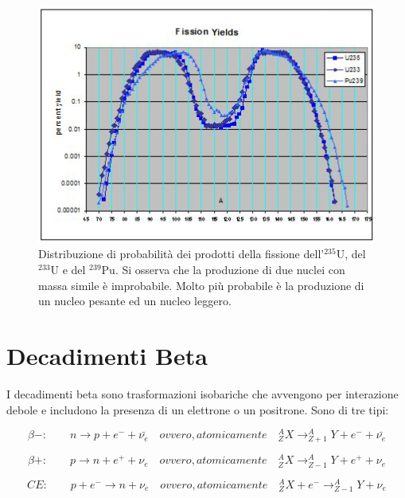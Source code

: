 \begin{figure}
\centering
		\includegraphics[width=12cm, keepaspectratio]{figs/fissionyealds.png}
		\caption{Distribuzione di probabilità dei prodotti della fissione dell'$^{235}\text{U}$, del $^{233}\text{U}$ e del $^{239}\text{Pu}$. Si osserva che la produzione di due nuclei con massa simile è improbabile. Molto più probabile è la produzione di un nucleo pesante ed un nucleo leggero.}
         \label{fissionyealds}
\end{figure}

\section{Decadimenti Beta}

I decadimenti beta sono trasformazioni isobariche che avvengono per interazione debole e includono la presenza di un elettrone o un positrone. Sono di tre tipi:

\begin{equation}
\beta-: \qquad n \longrightarrow p + e^-+\bar{\nu_e}  \quad ovvero, atomicamente \quad  ^A_ZX \longrightarrow _{Z+1}^AY+e^-+\bar{\nu_e}
\end{equation}


\begin{equation}
\beta+: \qquad p \longrightarrow n + e^++\nu_e \quad ovvero, atomicamente \quad  ^A_ZX \longrightarrow _{Z-1}^AY+e^++\nu_e
\end{equation}


\begin{equation}
CE: \qquad p + e^- \longrightarrow n + \nu_e \quad ovvero, atomicamente \quad  ^A_ZX+e^- \longrightarrow _{Z-1}^AY+\nu_e
\end{equation}

